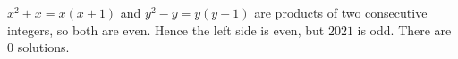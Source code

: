 $x^2+x=x(x+1)$ and $y^2-y=y(y-1)$ are products of two consecutive integers, so both are even. Hence the left side is even, but $2021$ is odd. There are $\boxed{0}$ solutions.

